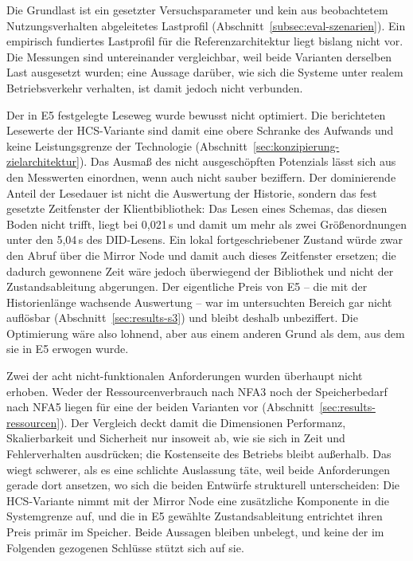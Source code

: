 Die Grundlast ist ein gesetzter Versuchsparameter und kein aus beobachtetem Nutzungsverhalten abgeleitetes Lastprofil (Abschnitt~\ref{subsec:eval-szenarien}). Ein empirisch fundiertes Lastprofil für die Referenzarchitektur liegt bislang nicht vor. Die Messungen sind untereinander vergleichbar, weil beide Varianten derselben Last ausgesetzt wurden; eine Aussage darüber, wie sich die Systeme unter realem Betriebsverkehr verhalten, ist damit jedoch nicht verbunden.

Der in E5 festgelegte Leseweg wurde bewusst nicht optimiert. Die berichteten Lesewerte der HCS-Variante sind damit eine obere Schranke des Aufwands und keine Leistungsgrenze der Technologie (Abschnitt~\ref{sec:konzipierung-zielarchitektur}). Das Ausmaß des nicht ausgeschöpften Potenzials lässt sich aus den Messwerten einordnen, wenn auch nicht sauber beziffern. Der dominierende Anteil der Lesedauer ist nicht die Auswertung der Historie, sondern das fest gesetzte Zeitfenster der Klientbibliothek: Das Lesen eines Schemas, das diesen Boden nicht trifft, liegt bei 0,021\,s und damit um mehr als zwei Größenordnungen unter den 5,04\,s des DID-Lesens. Ein lokal fortgeschriebener Zustand würde zwar den Abruf über die Mirror Node und damit auch dieses Zeitfenster ersetzen; die dadurch gewonnene Zeit wäre jedoch überwiegend der Bibliothek und nicht der Zustandsableitung abgerungen. Der eigentliche Preis von E5 -- die mit der Historienlänge wachsende Auswertung -- war im untersuchten Bereich gar nicht auflösbar (Abschnitt~\ref{sec:results-s3}) und bleibt deshalb unbeziffert. Die Optimierung wäre also lohnend, aber aus einem anderen Grund als dem, aus dem sie in E5 erwogen wurde.

Zwei der acht nicht-funktionalen Anforderungen wurden überhaupt nicht erhoben. Weder der Ressourcenverbrauch nach NFA3 noch der Speicherbedarf nach NFA5 liegen für eine der beiden Varianten vor (Abschnitt~\ref{sec:results-ressourcen}). Der Vergleich deckt damit die Dimensionen Performanz, Skalierbarkeit und Sicherheit nur insoweit ab, wie sie sich in Zeit und Fehlerverhalten ausdrücken; die Kostenseite des Betriebs bleibt außerhalb. Das wiegt schwerer, als es eine schlichte Auslassung täte, weil beide Anforderungen gerade dort ansetzen, wo sich die beiden Entwürfe strukturell unterscheiden: Die HCS-Variante nimmt mit der Mirror Node eine zusätzliche Komponente in die Systemgrenze auf, und die in E5 gewählte Zustandsableitung entrichtet ihren Preis primär im Speicher. Beide Aussagen bleiben unbelegt, und keine der im Folgenden gezogenen Schlüsse stützt sich auf sie.


